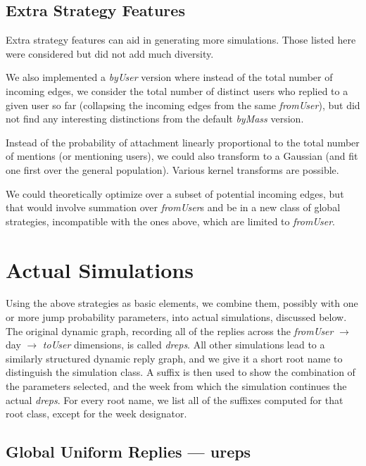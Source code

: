 \documentclass[10pt,oneside]{memoir}
\begin{document}
\subsection{Extra Strategy Features}
\label{extrastrategyfeatures}

\label{sec:extra-strategy-features}
Extra strategy features can aid in generating more simulations.  Those listed here were considered but did not add much diversity.


We also implemented a {\itshape byUser} version where instead of the total number of incoming edges, we consider the total number of distinct users who replied to a given user so far (collapsing the incoming edges from the same \emph{fromUser}), but did not find any interesting distinctions from the default \emph{byMass} version.


Instead of the probability of attachment linearly proportional to the total number of mentions (or mentioning users), we could also transform to a Gaussian (and fit one first over the general population).  Various kernel transforms are possible.


We could theoretically optimize over a subset of potential incoming edges, but that would involve summation over \emph{fromUser}s and be in a new class of global strategies, incompatible with the ones above, which are limited to {\itshape fromUser}.


\pagebreak \section{Actual Simulations}
\label{actualsimulations}

Using the above strategies as basic elements, we combine them, possibly with one or more jump probability parameters, into actual simulations, discussed below.  The original dynamic graph, recording all of the replies across the {\itshape fromUser} $\rightarrow$ day $\rightarrow$ {\itshape toUser} dimensions, is called {\itshape dreps}.  All other simulations lead to a similarly structured dynamic reply graph, and we give it a short root name to distinguish the simulation class.  A suffix is then used to show the combination of the parameters selected, and the week from which the simulation continues the actual {\itshape dreps}.  For every root name, we list all of the suffixes computed for that root class, except for the week designator.


\subsection{Global Uniform Replies --- ureps}
\label{globaluniformrepliesureps}
\end{document}
